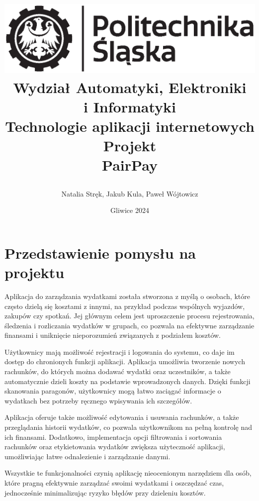 \documentclass[12pt,titlepage]{article}
\title{
\includegraphics[scale=0.75]{img/politechnika_sl_logo_bw_poziom_pl.eps}\\
\textbf{Wydział Automatyki, Elektroniki\\
i Informatyki}\\
\vspace*{1cm}
Technologie aplikacji internetowych \\ Projekt \\ PairPay

\vspace*{5cm}
}
\author{
Natalia Stręk,
Jakub Kula,
Paweł Wójtowicz
}
\date{Gliwice 2024}
\begin{document}
\maketitle
\newpage
\section{Przedstawienie pomysłu na projektu}
Aplikacja do zarządzania wydatkami została stworzona z myślą o osobach, które często dzielą się kosztami z innymi, na przykład podczas wspólnych wyjazdów, zakupów czy spotkań. Jej głównym celem jest uproszczenie procesu rejestrowania, śledzenia i rozliczania wydatków w grupach, co pozwala na efektywne zarządzanie finansami i uniknięcie nieporozumień związanych z podziałem kosztów.

Użytkownicy mają możliwość rejestracji i logowania do systemu, co daje im dostęp do chronionych funkcji aplikacji. Aplikacja umożliwia tworzenie nowych rachunków, do których można dodawać wydatki oraz uczestników, a także automatycznie dzieli koszty na podstawie wprowadzonych danych. Dzięki funkcji skanowania paragonów, użytkownicy mogą łatwo zaciągać informacje o wydatkach bez potrzeby ręcznego wpisywania ich szczegółów.

Aplikacja oferuje także możliwość edytowania i usuwania rachunków, a także przeglądania historii wydatków, co pozwala użytkownikom na pełną kontrolę nad ich finansami. Dodatkowo, implementacja opcji filtrowania i sortowania rachunków oraz etykietowania wydatków zwiększa użyteczność aplikacji, umożliwiając łatwe odnalezienie i zarządzanie danymi.

Wszystkie te funkcjonalności czynią aplikację nieocenionym narzędziem dla osób, które pragną efektywnie zarządzać swoimi wydatkami i oszczędzać czas, jednocześnie minimalizując ryzyko błędów przy dzieleniu kosztów.
\end{document}
